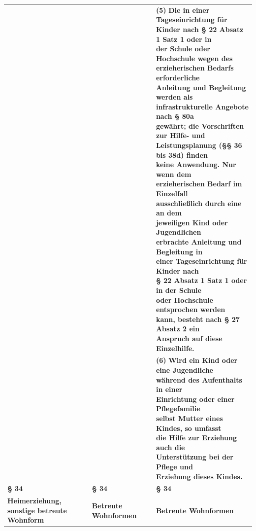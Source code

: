 \documentclass[10pt,a4paper,landscape]{article}
\begin{document}
\begin{longtable}{|L{8.2cm}|L{8.2cm}|L{8.2cm}|}
 &  & \textbf{\textcolor{diffgreen}{(5)}} \textbf{\textcolor{diffgreen}{Die in einer Tageseinrichtung für  \newline Kinder nach \S{} 22 Absatz 1 Satz 1 oder in  \newline der Schule oder Hochschule wegen des  \newline erzieherischen Bedarfs erforderliche  \newline Anleitung und Begleitung werden als  \newline infrastrukturelle Angebote nach \S{} 80a  \newline gewährt; die Vorschriften zur Hilfe- und  \newline Leistungsplanung (\S{}\S{} 36 bis 38d) finden  \newline keine Anwendung. Nur wenn dem  \newline erzieherischen Bedarf im Einzelfall  \newline ausschließlich durch eine an dem  \newline jeweiligen Kind oder Jugendlichen  \newline erbrachte Anleitung und Begleitung  in  \newline einer Tageseinrichtung für Kinder nach  \newline \S{} 22 Absatz 1 Satz 1 oder in der Schule  \newline oder Hochschule entsprochen werden  \newline kann, besteht nach \S{} 27 Absatz 2 ein  \newline Anspruch auf diese Einzelhilfe.}} \\
\hhline{|---|}
 &  & \textbf{\textcolor{diffgreen}{(6)}} \textbf{\textcolor{diffgreen}{Wird ein Kind oder eine Jugendliche  \newline während des Aufenthalts in einer  \newline Einrichtung oder einer Pflegefamilie  \newline selbst Mutter eines Kindes, so umfasst  \newline die Hilfe zur Erziehung auch die  \newline Unterstützung bei der Pflege und  \newline Erziehung dieses Kindes.}} \\
\hhline{|---|}
\textbf{\S{} 34} & \textbf{\S{} 34} & \textbf{\S{} 34} \\
\hhline{|---|}
\textbf{\textcolor{diffred}{Heimerziehung, sonstige betreute  \newline Wohnform}} & \textbf{Betreute Wohnformen} & \textbf{Betreute Wohnformen} \\

\end{longtable}
\end{document}
